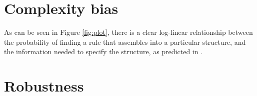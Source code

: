 \section{Complexity bias}

As can be seen in Figure \ref{fig:plot}, there is a clear log-linear relationship between the probability of finding a rule that assembles into a particular structure, and the information needed to specify the structure, as predicted in \cite{dingle2018input, dingle2020generic}.

\section{Robustness}
